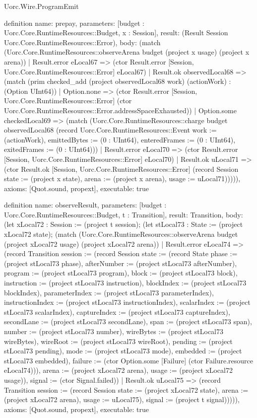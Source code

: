 \begin{lexlean}{Uorc.Wire.ProgramEmit}
\begin{semanticmodule}
definition{
  name: prepay,
  parameters: [budget : Uorc.Core.RuntimeResources::Budget, x : Session],
  result: (Result Session Uorc.Core.RuntimeResources::Error),
  body: (match (Uorc.Core.RuntimeResources::observeArena budget (project x usage) (project x arena))
    | Result.error eLocal67 => (ctor Result.error [Session, Uorc.Core.RuntimeResources::Error] eLocal67)
    | Result.ok observedLocal68 => (match (prim checked_add (project observedLocal68 work) (actionWork) : (Option UInt64))
      | Option.none => (ctor Result.error [Session, Uorc.Core.RuntimeResources::Error] (ctor Uorc.Core.RuntimeResources::Error.addressSpaceExhausted))
      | Option.some checkedLocal69 => (match (Uorc.Core.RuntimeResources::charge budget observedLocal68 (record Uorc.Core.RuntimeResources::Event {work := (actionWork), emittedBytes := (0 : UInt64), enteredFrames := (0 : UInt64), exitedFrames := (0 : UInt64)}))
        | Result.error eLocal70 => (ctor Result.error [Session, Uorc.Core.RuntimeResources::Error] eLocal70)
        | Result.ok uLocal71 => (ctor Result.ok [Session, Uorc.Core.RuntimeResources::Error] (record Session {state := (project x state), arena := (project x arena), usage := uLocal71}))))),
  axioms: [Quot.sound, propext],
  executable: true
}

definition{
  name: observeResult,
  parameters: [budget : Uorc.Core.RuntimeResources::Budget, t : Transition],
  result: Transition,
  body: (let xLocal72 : Session := (project t session); (let stLocal73 : State := (project xLocal72 state); (match (Uorc.Core.RuntimeResources::observeArena budget (project xLocal72 usage) (project xLocal72 arena))
    | Result.error eLocal74 => (record Transition {session := (record Session {state := (record State {phase := (project stLocal73 phase), afterNumber := (project stLocal73 afterNumber), program := (project stLocal73 program), block := (project stLocal73 block), instruction := (project stLocal73 instruction), blockIndex := (project stLocal73 blockIndex), parameterIndex := (project stLocal73 parameterIndex), instructionIndex := (project stLocal73 instructionIndex), scalarIndex := (project stLocal73 scalarIndex), captureIndex := (project stLocal73 captureIndex), secondLane := (project stLocal73 secondLane), span := (project stLocal73 span), number := (project stLocal73 number), wireBytes := (project stLocal73 wireBytes), wireRoot := (project stLocal73 wireRoot), pending := (project stLocal73 pending), mode := (project stLocal73 mode), embedded := (project stLocal73 embedded), failure := (ctor Option.some [Failure] (ctor Failure.resource eLocal74))}), arena := (project xLocal72 arena), usage := (project xLocal72 usage)}), signal := (ctor Signal.failed)})
    | Result.ok uLocal75 => (record Transition {session := (record Session {state := (project xLocal72 state), arena := (project xLocal72 arena), usage := uLocal75}), signal := (project t signal)})))),
  axioms: [Quot.sound, propext],
  executable: true
}


\end{semanticmodule}
\end{lexlean}
